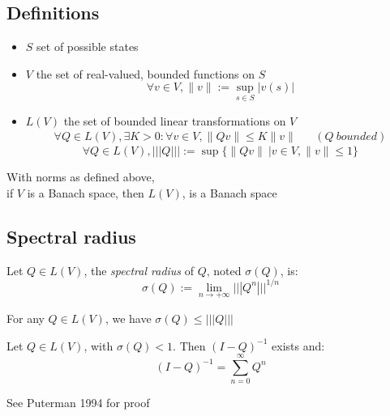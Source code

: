 \documentclass{beamer}
\begin{document}
	\subsection{Definitions}
		\begin{frame}
		
			\begin{definition}
				\begin{itemize}
					\item $S$ set of possible states
					\item $V$ the set of real-valued, bounded functions on $S$
					\[
						\forall v \in V, \| v \| := \sup_{s \in S} | v(s) |		
					\]
					\item $L(V)$ the set of bounded linear transformations on $V$
					\begin{align*}
						\forall Q \in L(V), \exists K>0: \forall v \in V, \| Qv \| \leq K \| v \| &	& (Q \ bounded)		
					\end{align*}
					\[
						\forall Q \in L(V), ||| Q ||| := \sup \{ \| Qv \| \ \big| v \in V, \| v \|  \leq 1\}	
					\]
				\end{itemize}
			\end{definition}
			
			\begin{theorem}
				With norms as defined above, \\
				if $V$ is a Banach space, then $L(V)$, is a Banach space
			\end{theorem}
		\end{frame}
	
	\subsection{Spectral radius}
		\begin{frame}
		
			\begin{definition}
				Let $Q \in L(V)$, the \emph{spectral radius} of $Q$, noted $\sigma(Q)$, is:
				\[
					\sigma(Q) := \lim_{n\rightarrow +\infty} |||Q^{n}|||^{1/n}		
				\]
			\end{definition}
			
			For any $Q \in L(V)$, we have $\sigma(Q) \leq ||| Q |||$\\
			
			\begin{theorem}[]
				Let $Q \in L(V)$, with $\sigma(Q)<1$. Then $(I-Q)^{-1}$ exists and:
				\[
					(I-Q)^{-1} = \sum_{n=0}^{\infty} Q^{n}
				\]
			\end{theorem}

			See Puterman 1994 for proof
	    \end{frame}
    
\end{document}
